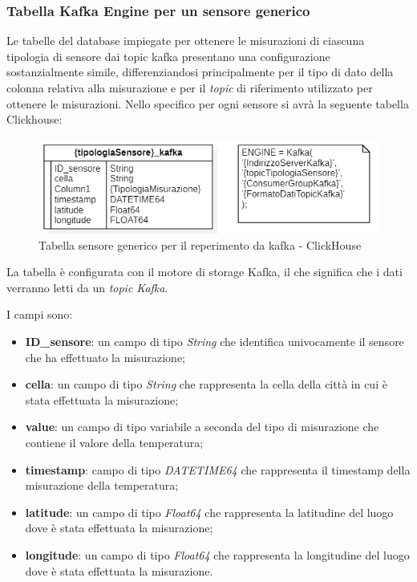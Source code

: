 \subsubsection{Tabella Kafka Engine per un sensore generico}
Le tabelle del database impiegate per ottenere le misurazioni di ciascuna tipologia di sensore dai topic kafka presentano una configurazione sostanzialmente simile, differenziandosi principalmente per il tipo di dato della colonna relativa alla misurazione e per il \textit{topic} di riferimento utilizzato per ottenere le misurazioni.
Nello specifico per ogni sensore si avrà la seguente tabella Clickhouse:
\begin{figure}[H]
    \centering
    \includegraphics[width=.6\textwidth]{../Images/SpecificaTecnica/sensorType_kafka.PNG}
    \caption{Tabella sensore generico per il reperimento da kafka - ClickHouse}
    \label{fig:Reperimento_kafka_clickhouse}
  \end{figure}

    La tabella è configurata con il motore di storage Kafka, il che significa che i dati verranno letti da un \textit{topic Kafka}. 

    I campi sono:
    \begin{itemize}
        \item \textbf{ID\_sensore}: un campo di tipo \textit{String} che identifica univocamente il sensore che ha effettuato la misurazione;
        \item \textbf{cella}: un campo di tipo \textit{String} che rappresenta la cella della città in cui è stata effettuata la misurazione;
        \item \textbf{value}: un campo di tipo variabile a seconda del tipo di misurazione che contiene il valore della temperatura;
        \item \textbf{timestamp}: campo di tipo \textit{DATETIME64} che rappresenta il timestamp della misurazione della temperatura;
        \item \textbf{latitude}: un campo di tipo \textit{Float64} che rappresenta la latitudine del luogo dove è stata effettuata la misurazione;
        \item \textbf{longitude}: un campo di tipo \textit{Float64} che rappresenta la longitudine del luogo dove è stata effettuata la misurazione.
    \end{itemize}

